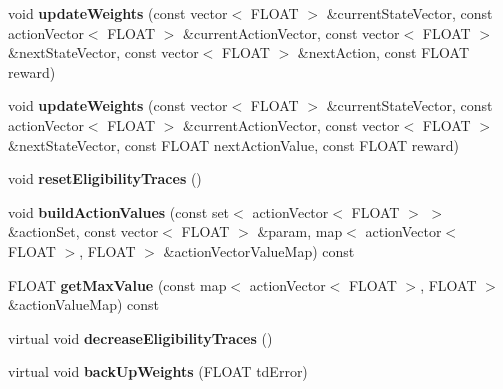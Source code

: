 \begin{DoxyCompactItemize}
\item 
\hypertarget{classAI_1_1Algorithm_1_1GradientDescent_ab9193530a8d9c61f38707c5a3fc995eb}{void {\bfseries update\-Weights} (const vector$<$ F\-L\-O\-A\-T $>$ \&current\-State\-Vector, const action\-Vector$<$ F\-L\-O\-A\-T $>$ \&current\-Action\-Vector, const vector$<$ F\-L\-O\-A\-T $>$ \&next\-State\-Vector, const vector$<$ F\-L\-O\-A\-T $>$ \&next\-Action, const F\-L\-O\-A\-T reward)}\label{classAI_1_1Algorithm_1_1GradientDescent_ab9193530a8d9c61f38707c5a3fc995eb}

\item 
\hypertarget{classAI_1_1Algorithm_1_1GradientDescent_a353e283f916955efd47a830425583210}{void {\bfseries update\-Weights} (const vector$<$ F\-L\-O\-A\-T $>$ \&current\-State\-Vector, const action\-Vector$<$ F\-L\-O\-A\-T $>$ \&current\-Action\-Vector, const vector$<$ F\-L\-O\-A\-T $>$ \&next\-State\-Vector, const F\-L\-O\-A\-T next\-Action\-Value, const F\-L\-O\-A\-T reward)}\label{classAI_1_1Algorithm_1_1GradientDescent_a353e283f916955efd47a830425583210}

\item 
\hypertarget{classAI_1_1Algorithm_1_1GradientDescent_a2ce6e2bbfc5b4d821d02f454c0e3c8c5}{void {\bfseries reset\-Eligibility\-Traces} ()}\label{classAI_1_1Algorithm_1_1GradientDescent_a2ce6e2bbfc5b4d821d02f454c0e3c8c5}

\item 
\hypertarget{classAI_1_1Algorithm_1_1GradientDescent_a7f58c9d3f1c760d5e4d1f9546abb1bec}{void {\bfseries build\-Action\-Values} (const set$<$ action\-Vector$<$ F\-L\-O\-A\-T $>$ $>$ \&action\-Set, const vector$<$ F\-L\-O\-A\-T $>$ \&param, map$<$ action\-Vector$<$ F\-L\-O\-A\-T $>$, F\-L\-O\-A\-T $>$ \&action\-Vector\-Value\-Map) const }\label{classAI_1_1Algorithm_1_1GradientDescent_a7f58c9d3f1c760d5e4d1f9546abb1bec}

\item 
\hypertarget{classAI_1_1Algorithm_1_1GradientDescent_a651b2804acf14aaebdf461d39cd970eb}{F\-L\-O\-A\-T {\bfseries get\-Max\-Value} (const map$<$ action\-Vector$<$ F\-L\-O\-A\-T $>$, F\-L\-O\-A\-T $>$ \&action\-Value\-Map) const }\label{classAI_1_1Algorithm_1_1GradientDescent_a651b2804acf14aaebdf461d39cd970eb}

\item 
\hypertarget{classAI_1_1Algorithm_1_1GradientDescent_a5c5ae472417bc016fdd185875614359d}{virtual void {\bfseries decrease\-Eligibility\-Traces} ()}\label{classAI_1_1Algorithm_1_1GradientDescent_a5c5ae472417bc016fdd185875614359d}

\item 
\hypertarget{classAI_1_1Algorithm_1_1GradientDescent_a49b556716f8ca93c088b10f4432a3688}{virtual void {\bfseries back\-Up\-Weights} (F\-L\-O\-A\-T td\-Error)}\label{classAI_1_1Algorithm_1_1GradientDescent_a49b556716f8ca93c088b10f4432a3688}

\end{DoxyCompactItemize}
